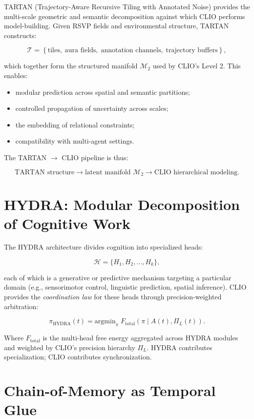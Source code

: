 \documentclass[12pt,oneside]{book}
\theoremstyle{plain}
\theoremstyle{definition}
\begin{document}
TARTAN (Trajectory-Aware Recursive Tiling with Annotated Noise) provides the
multi-scale geometric and semantic decomposition against which CLIO performs
model-building.
Given RSVP fields and environmental structure, TARTAN constructs:

\[
\mathcal{T} = \left\{
    \text{tiles},\;
    \text{aura fields},\;
    \text{annotation channels},\;
    \text{trajectory buffers}
\right\},
\]

which together form the structured manifold $\mathcal{M}_2$ used by CLIO's
Level 2.
This enables:

\begin{itemize}
    \item modular prediction across spatial and semantic partitions;
    \item controlled propagation of uncertainty across scales;
    \item the embedding of relational constraints;
    \item compatibility with multi-agent settings.
\end{itemize}

The TARTAN $\rightarrow$ CLIO pipeline is thus:

\[
\text{TARTAN structure} \longrightarrow \text{latent manifold } \mathcal{M}_2
\longrightarrow \text{CLIO hierarchical modeling}.
\]

\section{HYDRA: Modular Decomposition of Cognitive Work}

The HYDRA architecture divides cognition into specialized heads:

\[
\mathcal{H} = \{ H_1, H_2, \dots, H_k \},
\]

each of which is a generative or predictive mechanism targeting a particular
domain (e.g., sensorimotor control, linguistic prediction, spatial
inference).
CLIO provides the \emph{coordination law} for these heads through
precision-weighted arbitration:

\[
\pi_{\text{HYDRA}}(t)
=
\mathrm{argmin}_\pi\;
F_{\text{total}}(\pi \mid A(t), \Pi_L(t)).
\]

Where $F_{\text{total}}$ is the multi-head free energy aggregated across
HYDRA modules and weighted by CLIO’s precision hierarchy $\Pi_L$.
HYDRA contributes specialization; CLIO contributes synchronization.

\section{Chain-of-Memory as Temporal Glue}
\end{document}
